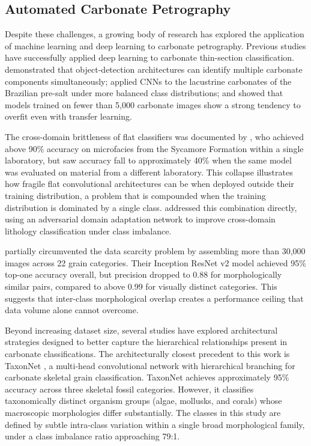 \documentclass[a4paper,fleqn]{cas-dc}
\begin{document}
\subsection{Automated Carbonate Petrography}
\label{sec:lit_taxonnet}

Despite these challenges, a growing body of research has explored the application of machine learning and deep learning to carbonate petrography. Previous studies have successfully applied deep learning to carbonate thin-section classification. \citet{dong2025carbonate} demonstrated that object-detection architectures can identify multiple carbonate components simultaneously; \citet{basso2025presalt} applied CNNs to the lacustrine carbonates of the Brazilian pre-salt under more balanced class distributions; and \citet{dawson2023dataset} showed that models trained on fewer than 5,000 carbonate images show a strong tendency to overfit even with transfer learning.%

The cross-domain brittleness of flat classifiers was documented by \citet{pireslima2020}, who achieved above 90\% accuracy on microfacies from the Sycamore Formation within a single laboratory, but saw accuracy fall to approximately 40\% when the same model was evaluated on material from a different laboratory. This collapse illustrates how fragile flat convolutional architectures can be when deployed outside their training distribution, a problem that is compounded when the training distribution is dominated by a single class. \citet{xie2025} addressed this combination directly, using an adversarial domain adaptation network to improve cross-domain lithology classification under class imbalance.

\citet{liu2020} partially circumvented the data scarcity problem by assembling more than 30,000 images across 22 grain categories. Their Inception ResNet v2 model achieved 95\% top-one accuracy overall, but precision dropped to 0.88 for morphologically similar pairs, compared to above 0.99 for visually distinct categories. This suggests that inter-class morphological overlap creates a performance ceiling that data volume alone cannot overcome.

Beyond increasing dataset size, several studies have explored architectural strategies designed to better capture the hierarchical relationships present in carbonate classifications. The architecturally closest precedent to this work is TaxonNet \citep{ho2023}, a multi-head convolutional network with hierarchical branching for carbonate skeletal grain classification. TaxonNet achieves approximately 95\% accuracy across three skeletal fossil categories. However, it classifies taxonomically distinct organism groups (algae, mollusks, and corals) whose macroscopic morphologies differ substantially. The classes in this study are defined by subtle intra-class variation within a single broad morphological family, under a class imbalance ratio approaching 79:1.
\end{document}
